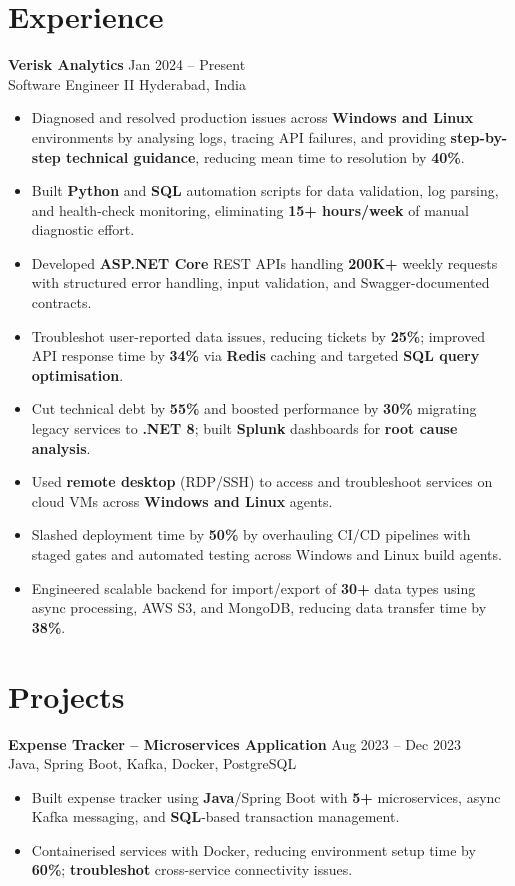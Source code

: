 \documentclass[10pt,letterpaper]{article}
\newcommand{\resumeSubheading}[4]{%
  \textbf{#1} \hfill #2 \\
  #3 \hfill #4 \\
}
\begin{document}
\section*{Experience}
\resumeSubheading{Verisk Analytics}{Jan 2024 -- Present}{Software Engineer II}{Hyderabad, India}
\begin{itemize}
    \item Diagnosed and resolved production issues across \textbf{Windows and Linux} environments by analysing logs, tracing API failures, and providing \textbf{step-by-step technical guidance}, reducing mean time to resolution by \textbf{40\%}.
    \item Built \textbf{Python} and \textbf{SQL} automation scripts for data validation, log parsing, and health-check monitoring, eliminating \textbf{15+ hours/week} of manual diagnostic effort.
    \item Developed \textbf{ASP.NET Core} REST APIs handling \textbf{200K+} weekly requests with structured error handling, input validation, and Swagger-documented contracts.
    \item Troubleshot user-reported data issues, reducing tickets by \textbf{25\%}; improved API response time by \textbf{34\%} via \textbf{Redis} caching and targeted \textbf{SQL query optimisation}.
    \item Cut technical debt by \textbf{55\%} and boosted performance by \textbf{30\%} migrating legacy services to \textbf{.NET 8}; built \textbf{Splunk} dashboards for \textbf{root cause analysis}.
    \item Used \textbf{remote desktop} (RDP/SSH) to access and troubleshoot services on cloud VMs across \textbf{Windows and Linux} agents.
    \item Slashed deployment time by \textbf{50\%} by overhauling CI/CD pipelines with staged gates and automated testing across Windows and Linux build agents.
    \item Engineered scalable backend for import/export of \textbf{30+} data types using async processing, AWS S3, and MongoDB, reducing data transfer time by \textbf{38\%}.
\end{itemize}

\section*{Projects}
\resumeSubheading{Expense Tracker -- Microservices Application}{Aug 2023 -- Dec 2023}{}{Java, Spring Boot, Kafka, Docker, PostgreSQL}
\begin{itemize}
    \item Built expense tracker using \textbf{Java}/Spring Boot with \textbf{5+} microservices, async Kafka messaging, and \textbf{SQL}-based transaction management.
    \item Containerised services with Docker, reducing environment setup time by \textbf{60\%}; \textbf{troubleshot} cross-service connectivity issues.
\end{itemize}
\end{document}
